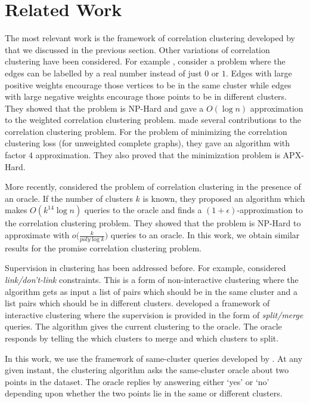 \documentclass[12pt]{article}
\begin{document}
\section{Related Work}
The most relevant work is the framework of correlation clustering developed by \cite{bansal2004correlation} that we discussed in the previous section. Other variations of correlation clustering have been considered. For example \cite{demaine2006correlation}, consider a problem where the edges can be labelled by a real number instead of just $0$ or $1$. Edges with large positive weights encourage those vertices to be in the same cluster while edges with large negative weights encourage those points to be in different clusters. They showed that the problem is NP-Hard and gave a $O(\log n)$ approximation to the weighted correlation clustering problem. \cite{charikar2005clustering} made several contributions to the correlation clustering problem. For the problem of minimizing the correlation clustering loss (for unweighted complete graphs), they gave an algorithm with factor $4$ approximation. They also proved that the minimization problem is APX-Hard. 

More recently, \cite{ailon2018approximate} considered the problem of correlation clustering in the presence of an oracle. If the number of clusters $k$ is known, they proposed an algorithm which makes $O(k^{14} \log n)$ queries to the oracle and finds a $(1+\epsilon)$-approximation to the correlation clustering problem. They showed that the problem is NP-Hard to approximate with $o\big(\frac{k}{poly \log k}\big)$ queries to an oracle. In this work, we obtain similar results for the {promise correlation clustering} problem.

Supervision in clustering has been addressed before. For example, \cite{kulis2009semi,basu2004probabilistic,basu2002semi} considered {\em link/don't-link} constraints. This is a form of non-interactive clustering where the algorithm gets as input a list of pairs which should be in the same cluster and a list pairs which should be in different clusters. \cite{balcan2008clustering} developed a framework of interactive clustering where the supervision is provided in the form of {\em split/merge} queries. The algorithm gives the current clustering to the oracle. The oracle responds by telling the which clusters to merge and which clusters to split. 

In this work, we use the framework of same-cluster queries developed by \cite{ashtiani2016clustering}. At any given instant, the clustering algorithm asks the same-cluster oracle about two points in the dataset. The oracle replies by answering either `yes' or `no' depending upon whether the two points lie in the same or different clusters. 
\end{document}
